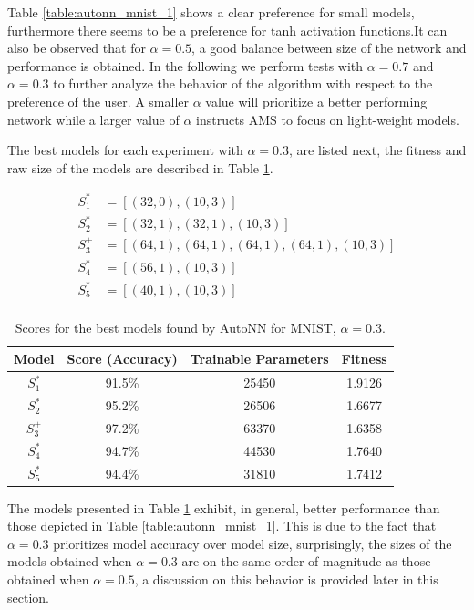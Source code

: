 \documentclass[journal]{IEEEtran}
\begin{document}
Table \ref{table:autonn_mnist_1} shows a clear preference for small models, furthermore there seems to be a preference for tanh activation functions.It can also be observed that for $\alpha = 0.5$, a good balance between size of the network and performance is obtained. In the following we perform tests with $\alpha = 0.7$ and $\alpha = 0.3$ to further analyze the behavior of the algorithm with respect to the preference of the user. A smaller $\alpha$ value will prioritize a better performing network while a larger value of $\alpha$ instructs AMS to focus on light-weight models.

The best models for each experiment with $\alpha = 0.3$, are listed next, the fitness and raw size of the models are described in Table \ref{table:autonn_mnist_2}. 

\begin{align*}
S^*_1 & = \left[ (32, 0), (10, 3) \right] \\
S^*_2 & = \left[ (32, 1), (32, 1), (10, 3) \right] \\
S^+_3 & = \left[ (64, 1), (64, 1), (64, 1), (64, 1), (10, 3) \right] \\
S^*_4 & = \left[ (56, 1),  (10, 3) \right] \\
S^*_5 & = \left[ (40, 1), (10, 3) \right] \\
\end{align*}

\begin{table}[!htb]
\begin{center}
\begin{tabular}{| c | c | c | c |}
\hline
Model & Score (Accuracy) & Trainable Parameters & Fitness\\
\hline
$S^*_1$ & 91.5\% & 25450 & 1.9126\\
$S^*_2$ & 95.2\% & 26506 & 1.6677\\
$S^+_3$ & 97.2\% & 63370 & 1.6358\\
$S^*_4$ & 94.7\% & 44530 & 1.7640\\
$S^*_5$ & 94.4\% & 31810 & 1.7412\\
\hline
\end{tabular}
\end{center}
\caption{Scores for the best models found by AutoNN for MNIST, $\alpha = 0.3$.}
\label{table:autonn_mnist_2}
\end{table}

The models presented in Table \ref{table:autonn_mnist_2} exhibit, in general, better performance than those depicted in Table \ref{table:autonn_mnist_1}. This is due to the fact that $\alpha = 0.3$ prioritizes model accuracy over model size, surprisingly, the sizes of the models obtained when $\alpha = 0.3$ are on the same order of magnitude as those obtained when $\alpha = 0.5$, a discussion on this behavior is provided later in this section.
\end{document}
